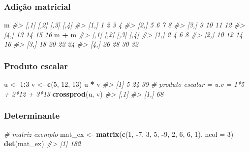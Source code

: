 \documentclass[]{book}
\newenvironment{Shaded}{\begin{snugshade}}{\end{snugshade}}
\newcommand{\KeywordTok}[1]{\textcolor[rgb]{0.13,0.29,0.53}{\textbf{#1}}}
\newcommand{\DataTypeTok}[1]{\textcolor[rgb]{0.13,0.29,0.53}{#1}}
\newcommand{\DecValTok}[1]{\textcolor[rgb]{0.00,0.00,0.81}{#1}}
\newcommand{\StringTok}[1]{\textcolor[rgb]{0.31,0.60,0.02}{#1}}
\newcommand{\CommentTok}[1]{\textcolor[rgb]{0.56,0.35,0.01}{\textit{#1}}}
\newcommand{\OperatorTok}[1]{\textcolor[rgb]{0.81,0.36,0.00}{\textbf{#1}}}
\newcommand{\NormalTok}[1]{#1}
\begin{document}
\subsubsection{Adição matricial}\label{adicao-matricial}

\begin{Shaded}
\begin{Highlighting}[]
\NormalTok{m}
\CommentTok{#>      [,1] [,2] [,3] [,4]}
\CommentTok{#> [1,]    1    2    3    4}
\CommentTok{#> [2,]    5    6    7    8}
\CommentTok{#> [3,]    9   10   11   12}
\CommentTok{#> [4,]   13   14   15   16}
\NormalTok{m }\OperatorTok{+}\StringTok{ }\NormalTok{m}
\CommentTok{#>      [,1] [,2] [,3] [,4]}
\CommentTok{#> [1,]    2    4    6    8}
\CommentTok{#> [2,]   10   12   14   16}
\CommentTok{#> [3,]   18   20   22   24}
\CommentTok{#> [4,]   26   28   30   32}
\end{Highlighting}
\end{Shaded}

\subsubsection{Produto escalar}\label{produto-escalar}

\begin{Shaded}
\begin{Highlighting}[]
\NormalTok{u <-}\StringTok{ }\DecValTok{1}\OperatorTok{:}\DecValTok{3}
\NormalTok{v <-}\StringTok{ }\KeywordTok{c}\NormalTok{(}\DecValTok{5}\NormalTok{, }\DecValTok{12}\NormalTok{, }\DecValTok{13}\NormalTok{)}
\NormalTok{u }\OperatorTok{*}\StringTok{ }\NormalTok{v}
\CommentTok{#> [1]  5 24 39}
\CommentTok{# produto escalar = u.v = 1*5 + 2*12 + 3*13}
\KeywordTok{crossprod}\NormalTok{(u, v)}
\CommentTok{#>      [,1]}
\CommentTok{#> [1,]   68}
\end{Highlighting}
\end{Shaded}

\subsubsection{Determinante}\label{determinante}

\begin{Shaded}
\begin{Highlighting}[]
\CommentTok{# matriz exemplo}
\NormalTok{mat_ex <-}\StringTok{ }\KeywordTok{matrix}\NormalTok{(}\KeywordTok{c}\NormalTok{(}\DecValTok{1}\NormalTok{, }\OperatorTok{-}\DecValTok{7}\NormalTok{, }\DecValTok{3}\NormalTok{, }\DecValTok{5}\NormalTok{, }\OperatorTok{-}\DecValTok{9}\NormalTok{, }\DecValTok{2}\NormalTok{, }\DecValTok{6}\NormalTok{, }\DecValTok{6}\NormalTok{, }\DecValTok{1}\NormalTok{), }\DataTypeTok{ncol =} \DecValTok{3}\NormalTok{)}
\KeywordTok{det}\NormalTok{(mat_ex)}
\CommentTok{#> [1] 182}
\end{Highlighting}
\end{Shaded}
\end{document}
